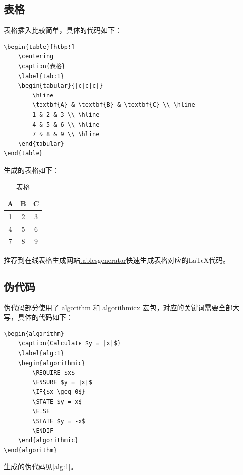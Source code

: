 \subsection{表格}

表格插入比较简单，具体的代码如下：
\begin{lstlisting}
\begin{table}[htbp!]
    \centering
    \caption{表格}
    \label{tab:1}
    \begin{tabular}{|c|c|c|}
        \hline
        \textbf{A} & \textbf{B} & \textbf{C} \\ \hline
        1 & 2 & 3 \\ \hline
        4 & 5 & 6 \\ \hline
        7 & 8 & 9 \\ \hline
    \end{tabular}
\end{table}
\end{lstlisting}
生成的表格如下：
\begin{table}[htb!]
    \centering
    \caption{表格}
    \label{tab:1}
    \begin{tabular}{|c|c|c|}
        \hline
        \textbf{A} & \textbf{B} & \textbf{C} \\ \hline
        1 & 2 & 3 \\ \hline
        4 & 5 & 6 \\ \hline
        7 & 8 & 9 \\ \hline
    \end{tabular}
\end{table}

推荐到在线表格生成网站\href{https://www.tablesgenerator.com/}{tablesgenerator}快速生成表格对应的LaTeX代码。

\subsection{伪代码}
伪代码部分使用了 algorithm 和 algorithmicx 宏包，对应的关键词需要全部大写，具体的代码如下：

\begin{lstlisting}
\begin{algorithm} 
    \caption{Calculate $y = |x|$} 
    \label{alg:1} 
    \begin{algorithmic}
        \REQUIRE $x$ 
        \ENSURE $y = |x|$ 
        \IF{$x \geq 0$} 
        \STATE $y = x$ 
        \ELSE 
        \STATE $y = -x$
        \ENDIF
    \end{algorithmic} 
\end{algorithm}
\end{lstlisting}
生成的伪代码见\cref{alg:1}。


